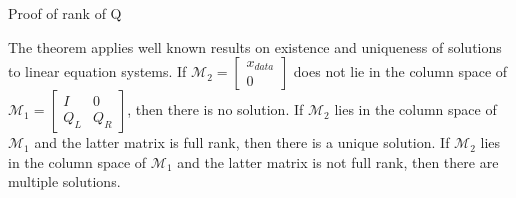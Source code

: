 \documentclass{elsart}
\begin{document}





Proof of rank of Q
\begin{prf}
The theorem applies well known 
results on existence and uniqueness of solutions to 
linear equation systems\cite{NOBLE}.
If
$\mathcal{M}_2=\begin{bmatrix}
  x_{data}\\0
\end{bmatrix}$ 
does not lie in the column space of $\mathcal{M}_1=\begin{bmatrix}
    I&0\\
Q_L&Q_R
  \end{bmatrix}$, then there is no solution.
If $\mathcal{M}_2$ lies in the column space of  $ \mathcal{M}_1 $ and the latter matrix is full rank, then there is a unique
solution.
If $\mathcal{M}_2$ lies in the column space of  $ \mathcal{M}_1$ and the latter matrix is not full rank, then there are
multiple solutions.
\end{prf}
\end{document}
